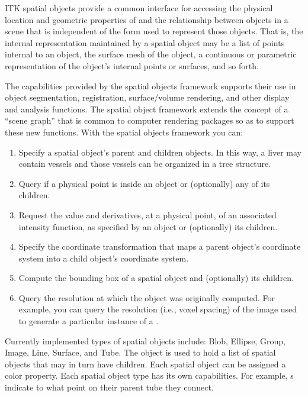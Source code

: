 ITK spatial objects provide a common interface for accessing the physical
location and geometric properties of and the relationship between objects in
a scene that is independent of the form used to represent those objects. That
is, the internal representation maintained by a spatial object may be a list
of points internal to an object, the surface mesh of the object, a continuous
or parametric representation of the object's internal points or surfaces, and
so forth.

The capabilities provided by the spatial objects framework supports their use
in object segmentation, registration, surface/volume rendering, and other
display and analysis functions. The spatial object framework extends the
concept of a ``scene graph''  that is common to computer rendering packages so
as to support these new functions. With the spatial objects framework you
can:
\begin{enumerate}

        \item Specify a spatial object's parent and children objects.  In
        this way, a liver may contain vessels and those vessels can be
        organized in a tree structure.

        \item Query if a physical point is inside an object or
        (optionally) any of its children.

        \item Request the value and derivatives, at a physical point,
        of an associated intensity function, as specified
        by an object or (optionally) its children.

        \item Specify the coordinate transformation that maps a parent
        object's coordinate system into a child object's coordinate system.

        \item Compute the bounding box of a spatial object and (optionally)
        its children.

        \item Query the resolution at which the object was originally
        computed.  For example, you can query the resolution (i.e., voxel
        spacing) of the image used to generate a particular instance of a
        .
\end{enumerate}

Currently implemented types of spatial objects include: Blob, Ellipse, Group,
Image, Line, Surface, and Tube.  The  object is used to hold
a list of spatial objects that may in turn have children.  Each spatial
object can be assigned a color property.  Each spatial object type has its
own capabilities. For example, s indicate to what
point on their parent tube they connect.

